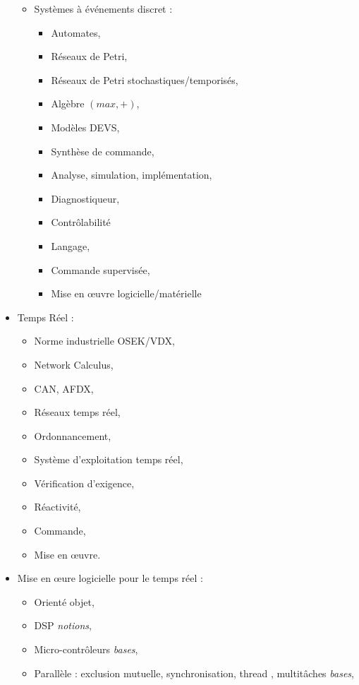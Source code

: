 \documentclass{article}
\begin{document}
\begin{itemize}
\begin{itemize}
		
		
		
	\item Systèmes à événements discret :
		\begin{itemize}
		\item Automates, 
		\item Réseaux de Petri, 
		\item Réseaux de Petri stochastiques/temporisés, 
		\item Algèbre $(max,+)$,
		\item Modèles DEVS,
		\item Synthèse de commande, 
		\item Analyse, simulation, implémentation, 
		\item Diagnostiqueur, 
		\item Contrôlabilité
		\item Langage, 
		\item Commande supervisée,
		\item Mise en \oe uvre logicielle/matérielle
		\end{itemize}
	\end{itemize}
	
\item Temps Réel : 
	\begin{itemize}
	\item Norme industrielle OSEK/VDX,
	\item Network Calculus,
	\item CAN, AFDX,
	\item Réseaux temps réel, 
	\item Ordonnancement, 
	\item Système d'exploitation temps réel,
	\item Vérification d’exigence, 
	\item Réactivité, 
	\item Commande,
	\item Mise en \oe uvre.
	\end{itemize}	
	
\item Mise en \oe ure logicielle pour le temps réel : %
	\begin{itemize}
	\item Orienté objet,
	\item DSP \textit{notions},
	\item Micro-contrôleurs \textit{bases},
	\item Parallèle : exclusion mutuelle, synchronisation, thread , multitâches \textit{bases},
	

\end{itemize}
\end{itemize}
\end{document}
